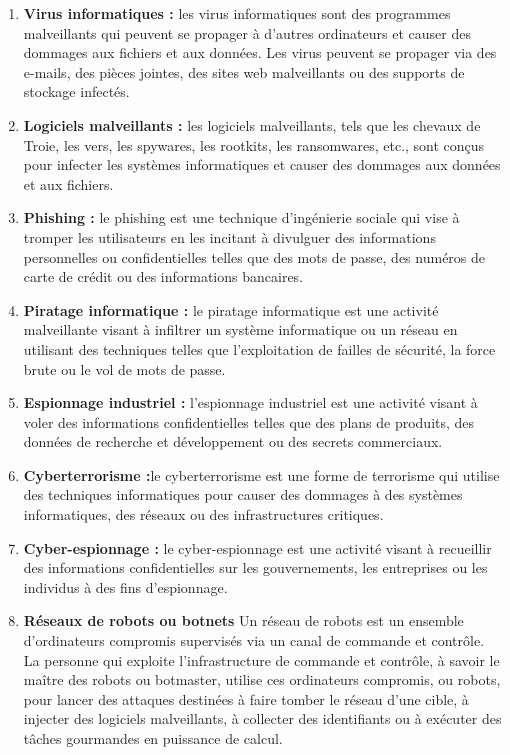  \begin{enumerate}
  \item \textbf{Virus informatiques :} les virus informatiques sont des programmes malveillants qui peuvent se propager à d'autres ordinateurs et causer des dommages aux fichiers et aux données. Les virus peuvent se propager via des e-mails, des pièces jointes, des sites web malveillants ou des supports de stockage infectés.
  \item \textbf{Logiciels malveillants :} les logiciels malveillants, tels que les chevaux de Troie, les vers, les spywares, les rootkits, les ransomwares, etc., sont conçus pour infecter les systèmes informatiques et causer des dommages aux données et aux fichiers.
  \item \textbf{ Phishing :} le phishing est une technique d'ingénierie sociale qui vise à tromper les utilisateurs en les incitant à divulguer des informations personnelles ou confidentielles telles que des mots de passe, des numéros de carte de crédit ou des informations bancaires.
 
  \item \textbf{Piratage informatique :} le piratage informatique est une activité malveillante visant à infiltrer un système informatique ou un réseau en utilisant des techniques telles que l'exploitation de failles de sécurité, la force brute ou le vol de mots de passe.
  \item \textbf{Espionnage industriel :} l'espionnage industriel est une activité visant à voler des informations confidentielles telles que des plans de produits, des données de recherche et développement ou des secrets commerciaux.
  \item \textbf{Cyberterrorisme :}le cyberterrorisme est une forme de terrorisme qui utilise des techniques informatiques pour causer des dommages à des systèmes informatiques, des réseaux ou des infrastructures critiques.
  \item \textbf{Cyber-espionnage :} le cyber-espionnage est une activité visant à recueillir des informations confidentielles sur les gouvernements, les entreprises ou les individus à des fins d'espionnage.
  \item \textbf{Réseaux de robots ou botnets}
  Un réseau de robots est un ensemble d’ordinateurs compromis supervisés via un canal de commande et contrôle. La personne qui exploite l’infrastructure de commande et contrôle, à savoir le maître des robots ou botmaster, utilise ces ordinateurs compromis, ou robots, pour lancer des attaques destinées à faire tomber le réseau d’une cible, à injecter des logiciels malveillants, à collecter des identifiants ou à exécuter des tâches gourmandes en puissance de calcul.\\
 \end{enumerate}

